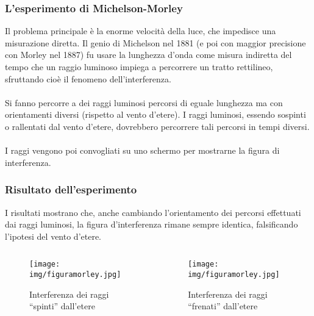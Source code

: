 \documentclass[]{beamer}
\theoremstyle{plain}
\begin{document}
\begin{frame}
\frametitle{L'esperimento di Michelson-Morley}
Il problema principale è la enorme velocità della luce, che impedisce una misurazione diretta. Il genio di Michelson nel 1881 (e poi con maggior precisione con Morley nel 1887) fu usare la lunghezza d'onda come misura indiretta del tempo che un raggio luminoso impiega a percorrere un tratto rettilineo, sfruttando cioè il fenomeno dell'\alert<1>{interferenza}.\\~\pause\\

Si fanno percorre a dei raggi luminosi percorsi di eguale lunghezza ma con orientamenti diversi (rispetto al vento d'etere). I raggi luminosi, essendo sospinti o rallentati dal vento d'etere, dovrebbero percorrere tali percorsi in \alert<2>{tempi diversi}.\\~\pause\\

I raggi vengono poi convogliati su uno schermo per mostrarne la \alert<3>{figura di interferenza}.
\end{frame}


\begin{frame}
  \frametitle{Risultato dell'esperimento}
I risultati mostrano che, anche cambiando l'orientamento dei percorsi effettuati dai raggi luminosi, la figura d'interferenza rimane sempre identica, falsificando l'ipotesi del vento d'etere.
  \begin{columns}
    \begin{column}{0.3\textwidth}
      \begin{figure}
        \texttt{[image: img/figuramorley.jpg]}
        
        {\footnotesize Interferenza dei raggi ``spinti'' dall'etere}
      \end{figure}
    \end{column}
    \begin{column}{0.3\textwidth}
      \begin{figure}
        \texttt{[image: img/figuramorley.jpg]}
        
        {\footnotesize Interferenza dei raggi ``frenati'' dall'etere}
      \end{figure}
    \end{column}
  \end{columns}
\end{frame}
\end{document}
